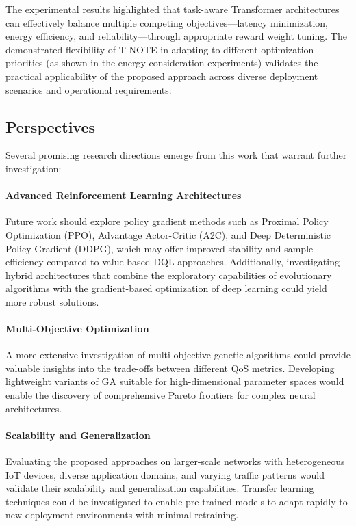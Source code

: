 \documentclass[preprint,3p,authoryear]{elsarticle}
\begin{document}
The experimental results highlighted that task-aware Transformer architectures can effectively balance multiple competing objectives—latency minimization, energy efficiency, and reliability—through appropriate reward weight tuning. The demonstrated flexibility of T-NOTE in adapting to different optimization priorities (as shown in the energy consideration experiments) validates the practical applicability of the proposed approach across diverse deployment scenarios and operational requirements.

\subsection{Perspectives}

Several promising research directions emerge from this work that warrant further investigation:

\paragraph{Advanced Reinforcement Learning Architectures}
Future work should explore policy gradient methods such as Proximal Policy Optimization (PPO), Advantage Actor-Critic (A2C), and Deep Deterministic Policy Gradient (DDPG), which may offer improved stability and sample efficiency compared to value-based DQL approaches. Additionally, investigating hybrid architectures that combine the exploratory capabilities of evolutionary algorithms with the gradient-based optimization of deep learning could yield more robust solutions.

\paragraph{Multi-Objective Optimization}
A more extensive investigation of multi-objective genetic algorithms could provide valuable insights into the trade-offs between different QoS metrics. Developing lightweight variants of GA suitable for high-dimensional parameter spaces would enable the discovery of comprehensive Pareto frontiers for complex neural architectures.

\paragraph{Scalability and Generalization}
Evaluating the proposed approaches on larger-scale networks with heterogeneous IoT devices, diverse application domains, and varying traffic patterns would validate their scalability and generalization capabilities. Transfer learning techniques could be investigated to enable pre-trained models to adapt rapidly to new deployment environments with minimal retraining.


  
 
\end{document}
